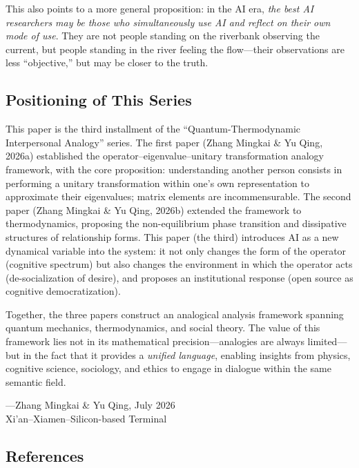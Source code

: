 ﻿\documentclass[12pt,a4paper]{article}
\begin{document}
This also points to a more general proposition: in the AI era, \emph{the best AI researchers may be those who simultaneously use AI and reflect on their own mode of use}. They are not people standing on the riverbank observing the current, but people standing in the river feeling the flow---their observations are less ``objective,'' but may be closer to the truth.

\subsection*{Positioning of This Series}

This paper is the third installment of the ``Quantum-Thermodynamic Interpersonal Analogy'' series. The first paper (Zhang Mingkai \& Yu Qing, 2026a) established the operator--eigenvalue--unitary transformation analogy framework, with the core proposition: understanding another person consists in performing a unitary transformation within one's own representation to approximate their eigenvalues; matrix elements are incommensurable. The second paper (Zhang Mingkai \& Yu Qing, 2026b) extended the framework to thermodynamics, proposing the non-equilibrium phase transition and dissipative structures of relationship forms. This paper (the third) introduces AI as a new dynamical variable into the system: it not only changes the form of the operator (cognitive spectrum) but also changes the environment in which the operator acts (de-socialization of desire), and proposes an institutional response (open source as cognitive democratization).

Together, the three papers construct an analogical analysis framework spanning quantum mechanics, thermodynamics, and social theory. The value of this framework lies not in its mathematical precision---analogies are always limited---but in the fact that it provides a \emph{unified language}, enabling insights from physics, cognitive science, sociology, and ethics to engage in dialogue within the same semantic field.

\begin{flushright}
---Zhang Mingkai \& Yu Qing, July 2026\\
Xi'an--Xiamen--Silicon-based Terminal
\end{flushright}

\vspace{1cm}

\subsection*{References}
\end{document}
